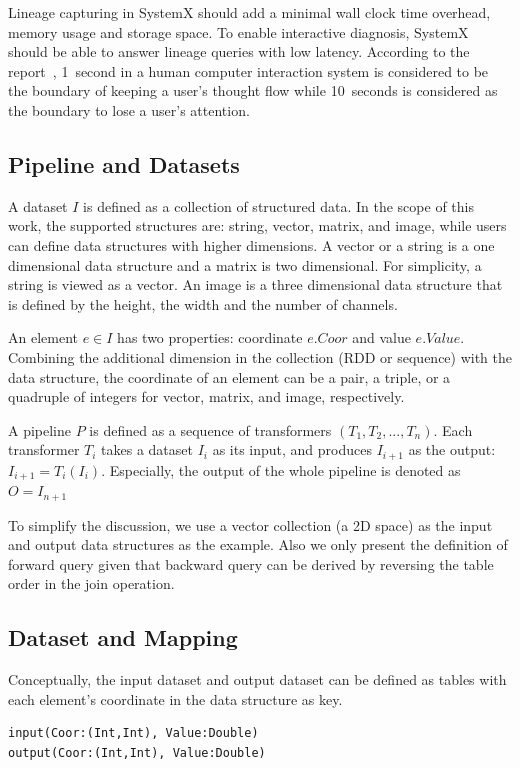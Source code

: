 \documentclass{sig-alternate}
\begin{document}
Lineage capturing in SystemX should add a minimal wall clock time overhead, memory usage and storage space.
To enable interactive diagnosis, SystemX should be able to answer lineage queries with low latency.
According to the report~\cite{nielsen2009}, 
1~second in a human computer interaction system is considered to be the boundary of keeping a user's thought flow while 
10~seconds is considered as the boundary to lose a user's attention.

\subsection{Pipeline and Datasets}
\label{sec:Map-Pipe-Data}
A dataset $I$ is defined as a collection of structured data. In the scope of this work, the supported structures are: 
string, vector, matrix, and image, while users can define data structures with higher dimensions.
A vector or a string is a one dimensional data structure and a matrix is two dimensional. 
For simplicity, a string is viewed as a vector.
An image is a three dimensional data structure that is defined by the height, the width and the number
of channels. 

An element $e \in I$ has two properties: coordinate $e.Coor$ and value $e.Value$. 
Combining the additional dimension in the collection (RDD or sequence) with the data structure, 
the coordinate of an element can be a pair, a triple, or a quadruple of integers
for vector, matrix, and image, respectively.

A pipeline $P$ is defined as a sequence of transformers $(T_1, T_2, ..., T_n)$. 
Each transformer $T_i$ takes a dataset $I_i$ as its input, and produces $I_{i+1}$ as the output: 
$I_{i+1} = T_i(I_i)$. 
Especially, the output of the whole pipeline is denoted as $O = I_{n+1}$

To simplify the discussion, we use a vector collection (a 2D space) as the input and output data structures as the example.
Also we only present the definition of forward query given that 
backward query can be derived by reversing the table order in the join operation.

\subsection{Dataset and Mapping}
\label{sec:formal-ds-mapping}
Conceptually, the input dataset and output dataset can be defined
as tables with each element's coordinate in the data structure as key.
\begin{lstlisting}
input(Coor:(Int,Int), Value:Double)
output(Coor:(Int,Int), Value:Double)
\end{lstlisting}
\end{document}
